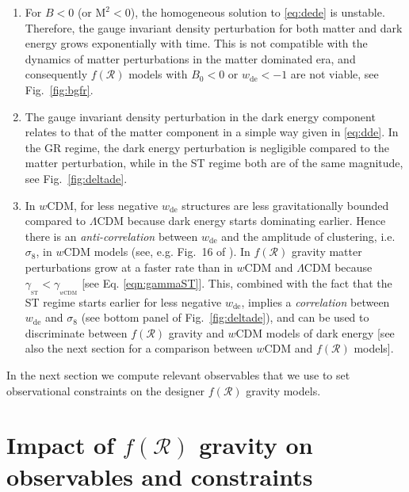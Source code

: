 \documentclass[nofootinbib,a4paper,aps,prd,10pt,superscriptaddress,reprint,showkeys,showpacs]{revtex4-1}
\newcommand{\qsubrm}[2]{{#1}_{\scriptscriptstyle{\textrm{#2}}}}
\begin{document}
\begin{enumerate}
\item For $B<0$ (or $\mathrm{M}^2<0$), the homogeneous solution to \eqref{eq:dede} is unstable. Therefore, the gauge 
invariant density perturbation for both matter and dark energy grows exponentially with time. This is not compatible 
with the dynamics of matter perturbations in the matter dominated era, and consequently $f(\mathcal{R})$ models with 
$\qsubrm{B}{0}<0$ or $\qsubrm{w}{de}<-1$ are not viable, see Fig.~\ref{fig:bgfr}.
\item \label{point2} The gauge invariant density perturbation in the dark energy component relates to that of the 
matter component in a simple way given in \eqref{eq:dde}. In the GR regime, the dark energy perturbation is negligible 
compared to the matter perturbation, while in the ST regime both are of the same magnitude, see Fig.~\ref{fig:deltade}.
\item \label{point3} In $w$CDM, for less negative $\qsubrm{w}{de}$ structures are less gravitationally bounded compared 
to $\Lambda$CDM because dark energy starts dominating earlier. 
Hence there is an \textit{anti-correlation} between $\qsubrm{w}{de}$ and the amplitude of clustering, i.e. 
$\qsubrm{\sigma}{8}$, in $w$CDM models (see, e.g. Fig.~16 of \citep{Komatsu2009}). In $f(\mathcal{R})$ gravity matter 
perturbations grow at a faster rate than in $w$CDM and $\Lambda$CDM because 
$\gamma_{_\mathrm{ST}}<\gamma_{_{w\mathrm{CDM}}}$ [see Eq. \eqref{eqn:gammaST}]. This, combined with the fact that the 
ST regime starts earlier for less negative $\qsubrm{w}{de}$, implies a \textit{correlation} between $\qsubrm{w}{de}$ 
and $\qsubrm{\sigma}{8}$ (see bottom panel of Fig.~\ref{fig:deltade}), and can be used to discriminate between 
$f(\mathcal{R})$ gravity and $w$CDM models of dark energy [see also the next section for a comparison between 
$w$CDM and $f(\mathcal{R})$ models].
\end{enumerate}
In the next section we compute relevant observables that we use to set observational constraints on the designer 
$f(\mathcal{R})$ gravity models.


\section{Impact of \texorpdfstring{$f(\mathcal{R})$}{f(R)} gravity on observables and constraints}\label{sect:obs}
\end{document}
